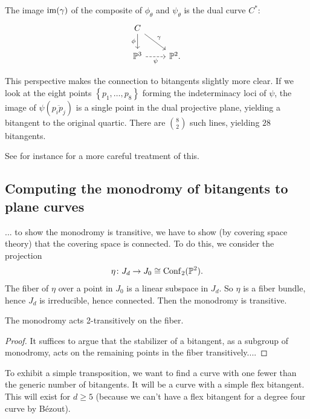 \documentclass[11pt]{amsart}
\providecommand{\Conf}{\mathrm{Conf}}
\begin{document}
\begin{proposition} The image $\mathrm{im}(\gamma)$ of the composite of $\phi_\theta$ and $\psi_\theta$ is the dual curve $C^\ast$:
\[ \begin{tikzcd}
    C\ar[dr,"\gamma"]\dar["\phi" left] & \\
    \P^3\rar[dashed,"\psi" below] & \P^2.
\end{tikzcd} \]
\end{proposition}

This perspective makes the connection to bitangents slightly more clear. If we look at the eight points $\left\{ p_1, \ldots, p_8 \right\}$ forming the indeterminacy loci of $\psi$, the image of $\psi(\overline{p_i p_j})$ is a single point in the dual projective plane, yielding a bitangent to the original quartic. There are $\binom{8}{2}$ such lines, yielding $28$ bitangents.

See for instance \cite[\S2]{Sameera-theta} for a more careful treatment of this.







\subsection{Computing the monodromy of bitangents to plane curves}




... to show the monodromy is transitive, we have to show (by covering space theory) that the covering space is connected. To do this, we consider the projection
\begin{align*}
    \eta \colon J_d \to J_0 \cong \Conf_2(\P^2).
\end{align*}
The fiber of $\eta$ over a point in $J_0$ is a linear subspace in $J_d$. So $\eta$ is a fiber bundle, hence $J_d$ is irreducible, hence connected. Then the monodromy is transitive.

\begin{proposition} The monodromy acts 2-transitively on the fiber.
\end{proposition}
\begin{proof} It suffices to argue that the stabilizer of a bitangent, as a subgroup of monodromy, acts on the remaining points in the fiber transitively....
\end{proof}


To exhibit a simple transposition, we want to find a curve with one fewer than the generic number of bitangents. It will be a curve with a simple flex bitangent. This will exist for $d \ge 5$ (because we can't have a flex bitangent for a degree four curve by B\'{e}zout).
\end{document}

